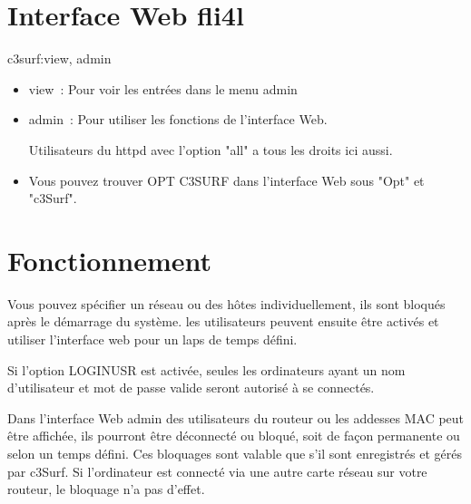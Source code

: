 \section {Interface Web fli4l}

c3surf:view, admin
\begin{itemize}
    \item view~: Pour voir les entrées dans le menu admin
    \item admin~: Pour utiliser les fonctions de l'interface Web.

    Utilisateurs du httpd avec l'option "all" a tous les droits ici aussi.

    \item Vous pouvez trouver OPT C3SURF dans l'interface Web sous "Opt" et "c3Surf".
\end{itemize}

\section {Fonctionnement}

Vous pouvez spécifier un réseau ou des hôtes individuellement, ils sont bloqués
après le démarrage du système. les utilisateurs peuvent ensuite être activés et
utiliser l'interface web pour un laps de temps défini.

\parskip 12pt

Si l'option LOGINUSR est activée, seules les ordinateurs ayant un nom d'utilisateur 
et mot de passe valide seront autorisé à se connectés.
\parskip 12pt

Dans l'interface Web admin des utilisateurs du routeur ou les addesses MAC peut être
affichée, ils pourront être déconnecté ou bloqué, soit de façon permanente ou selon
un temps défini. Ces bloquages sont valable que s'il sont enregistrés et gérés par c3Surf.
Si l'ordinateur est connecté via une autre carte réseau sur votre routeur, le bloquage
n'a pas d'effet.
\parskip 12pt

